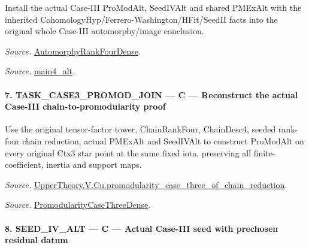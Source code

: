 \documentclass[11pt,a4paper]{article}
\numberwithin{equation}{section}
\theoremstyle{remark}\newtheorem{remark}[theorem]{Remark}
\begin{document}
Install the actual Case-III ProModAlt, SeedIVAlt and shared PMExAlt with the inherited CohomologyHyp/Ferrero-Washington/HFit/SeedII facts into the original whole Case-III automorphy/image conclusion.

\emph{Source.} \href{https://github.com/CocoSgt/riemann-hypothesis-lean/blob/7cbf7a0c32fca1badf05931879a37c3f8a2b03b4/src/Development/AutomorphicArithmetic/AutomorphicVarieties/ModularityArgument/ThresholdArguments/DenseThresholdCases/PromodularityCaseThree.lean#L43-L44}{AutomorphyRankFourDense}.

\emph{Source.} \href{https://github.com/CocoSgt/riemann-hypothesis-lean/blob/7cbf7a0c32fca1badf05931879a37c3f8a2b03b4/src/Development/AutomorphicArithmetic/AutomorphicVarieties/ModularityArgument/ThresholdArguments/DenseThresholdCases/CuFinal.lean#L44-L44}{main4\_\allowbreak alt}.



\paragraph{7. TASK\_\allowbreak CASE3\_\allowbreak PROMOD\_\allowbreak JOIN — C — Reconstruct the actual Case-III chain-to-promodularity proof}

Use the original tensor-factor tower, ChainRankFour, ChainDesc4, seeded rank-four chain reduction, actual PMExAlt and SeedIVAlt to construct ProModAlt on every original Ctx3 star point at the same fixed iota, preserving all finite-coefficient, inertia and support maps.

\emph{Source.} \href{https://github.com/CocoSgt/riemann-hypothesis-lean/blob/7cbf7a0c32fca1badf05931879a37c3f8a2b03b4/src/Development/AutomorphicArithmetic/AutomorphicVarieties/ModularityArgument/ThresholdArguments/DenseThresholdCases/PromodularityCaseThreeOfLemmas.lean#L131-L153}{UpperTheory.V.Cu.promodularity\_\allowbreak case\_\allowbreak three\_\allowbreak of\_\allowbreak chain\_\allowbreak reduction}.

\emph{Source.} \href{https://github.com/CocoSgt/riemann-hypothesis-lean/blob/7cbf7a0c32fca1badf05931879a37c3f8a2b03b4/src/Development/AutomorphicArithmetic/AutomorphicVarieties/ModularityArgument/ThresholdArguments/DenseThresholdCases/PromodularityCaseThree.lean#L40-L42}{PromodularityCaseThreeDense}.



\paragraph{8. SEED\_\allowbreak IV\_\allowbreak ALT — C — Actual Case-III seed with prechosen residual datum}
\end{document}
